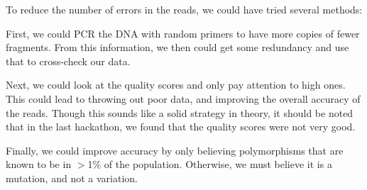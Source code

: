 To reduce the number of errors in the reads, we could have tried several methods:

First, we could PCR the DNA with random primers to have more copies of
fewer fragments. From this information, we then could get some redundancy and 
use that to cross-check our data.

Next, we could look at the quality scores and only pay attention to high ones.
This could lead to throwing out poor data, and improving the overall accuracy
of the reads. Though this sounds like a solid strategy in theory, it should be
noted that in the last hackathon, we found that the quality scores were not
very good.

Finally, we could improve accuracy by only believing polymorphisms that are known 
to be in $>$1\% of the population. Otherwise, we must believe it is a mutation, and
not a variation. 
